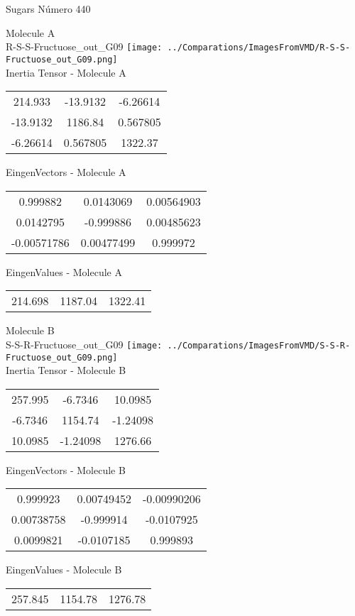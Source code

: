 \vtab[-2cm]
\begin{center}
{\large Sugars \tab Número 440}
\end{center}
\begin{multicols}{2}
\begin{center}

Molecule A \\ 
R-S-S-Fructuose\_out\_G09
\texttt{[image: ../Comparations/ImagesFromVMD/R-S-S-Fructuose\_out\_G09.png]}
\\
Inertia Tensor - Molecule A \\
\vtab

\begin{tabular}{|c c c|}
214.933	 & 	-13.9132	 & 	-6.26614	 \\
-13.9132	 & 	1186.84	 & 	0.567805	 \\
-6.26614	 & 	0.567805	 & 	1322.37
\end{tabular}

\vtab
 EingenVectors - Molecule A     \\
\vtab
\begin{tabular}{|c c c|}
0.999882	 & 	0.0143069	 & 	0.00564903	 \\
0.0142795	 & 	-0.999886	 & 	0.00485623	 \\
-0.00571786	 & 	0.00477499	 & 	0.999972
\end{tabular}

\vtab
 EingenValues - Molecule A     \\
\vtab
\begin{tabular}{|c c c|}
214.698	 & 	1187.04	 & 	1322.41	 \\
\end{tabular}
\columnbreak

Molecule B \\ 
S-S-R-Fructuose\_out\_G09
\texttt{[image: ../Comparations/ImagesFromVMD/S-S-R-Fructuose\_out\_G09.png]}
\\
Inertia Tensor - Molecule B \\
\vtab

\begin{tabular}{|c c c|}
257.995	 & 	-6.7346	 & 	10.0985	 \\
-6.7346	 & 	1154.74	 & 	-1.24098	 \\
10.0985	 & 	-1.24098	 & 	1276.66
\end{tabular}

\vtab
 EingenVectors - Molecule B     \\
\vtab
\begin{tabular}{|c c c|}
0.999923	 & 	0.00749452	 & 	-0.00990206	 \\
0.00738758	 & 	-0.999914	 & 	-0.0107925	 \\
0.0099821	 & 	-0.0107185	 & 	0.999893
\end{tabular}

\vtab
 EingenValues - Molecule B     \\
\vtab
\begin{tabular}{|c c c|}
257.845	 & 	1154.78	 & 	1276.78	 \\
\end{tabular}

\end{center}
\end{multicols}
